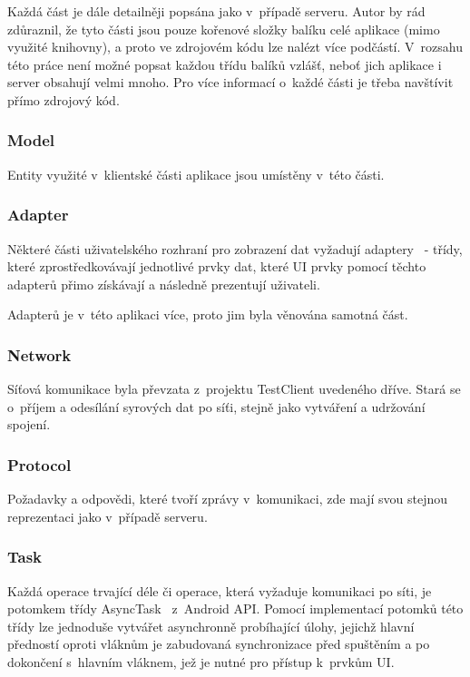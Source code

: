 \documentclass[thesis=B,czech]{FITthesis}[2013/10/20]
\begin{document}
Každá část je dále detailněji popsána jako v~případě serveru. Autor by rád zdůraznil, že tyto části jsou pouze kořenové složky balíku celé aplikace (mimo využité knihovny), a proto ve zdrojovém kódu lze nalézt více podčástí. V~rozsahu této práce není možné popsat každou třídu balíků vzlášť, neboť jich aplikace i server obsahují velmi mnoho. Pro více informací o~každé části je třeba navštívit přímo zdrojový kód.

\subsubsection{Model}

Entity využité v~klientské části aplikace jsou umístěny v~této části.

\subsubsection{Adapter}

Některé části uživatelského rozhraní pro zobrazení dat vyžadují adaptery~\cite{adapter} - třídy, které zprostředkovávají jednotlivé prvky dat, které UI prvky pomocí těchto adapterů přimo získávají a následně prezentují uživateli. 

Adapterů je v~této aplikaci více, proto jim byla věnována samotná část.

\subsubsection{Network}

Síťová komunikace byla převzata z~projektu TestClient uvedeného dříve. Stará se o~příjem a odesílání syrových dat po síťi, stejně jako vytváření a udržování spojení.

\subsubsection{Protocol}

Požadavky a odpovědi, které tvoří zprávy v~komunikaci, zde mají svou stejnou reprezentaci jako v~případě serveru.

\subsubsection{Task}

Každá operace trvající déle či operace, která vyžaduje komunikaci po síti, je potomkem třídy AsyncTask~\cite{async_task} z~Android API. Pomocí implementací potomků této třídy lze jednoduše vytvářet asynchronně probíhající úlohy, jejichž hlavní předností oproti vláknům je zabudovaná synchronizace před spuštěním a po dokončení s~hlavním vláknem, jež je nutné pro přístup k~prvkům UI.
\end{document}
